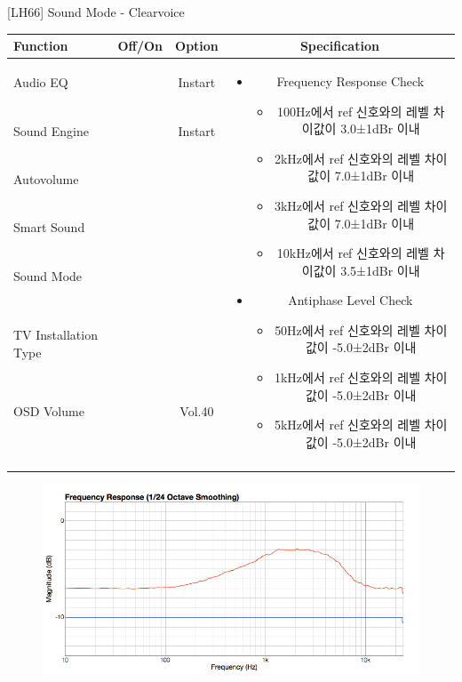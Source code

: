 \begin{frame}[t]{[LH66] Sound Mode - Clearvoice}
\begin{tiny}
\begin{tabular}{@{}lccc@{}}
\toprule
Function & Off/On & Option & Specification \\
\midrule
Audio EQ & \color{black}{Off} & Instart &
\multirow{10}{60mm}{
\begin{itemize}
\item Frequency Response Check
	\begin{itemize}
	\item 100Hz에서 ref 신호와의 레벨 차이값이 3.0±1dBr 이내
	\item 2kHz에서 ref 신호와의 레벨 차이값이 7.0±1dBr 이내
	\item 3kHz에서 ref 신호와의 레벨 차이값이 7.0±1dBr 이내
	\item 10kHz에서 ref 신호와의 레벨 차이값이 3.5±1dBr 이내
	\end{itemize}
\item Antiphase Level Check
	\begin{itemize}
	\item 50Hz에서 ref 신호와의 레벨 차이값이 -5.0±2dBr 이내
	\item 1kHz에서 ref 신호와의 레벨 차이값이 -5.0±2dBr 이내
	\item 5kHz에서 ref 신호와의 레벨 차이값이 -5.0±2dBr 이내
	\end{itemize}
\end{itemize}
} \\
Sound Engine & \color{blue}{On} & Instart & \\
Autovolume & \color{black}{Off} & & \\
Smart Sound & \color{black}{Off} & & \\
Sound Mode & \color{blue}{On} & \color{blue}{Clearvoice} & \\
TV Installation Type & \color{blue}{On} & \color{black}{Standtype1} & \\
OSD Volume & \color{blue}{On} & Vol.40 & \\
& & & \\
& & & \\
& & & \\
& & & \\
\midrule
\end{tabular}
\end{tiny}

\begin{figure}[b]
\includegraphics[height=0.3\textwidth]{figures/clearvoice.png}
\end{figure}

\end{frame}
